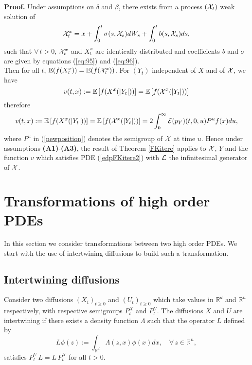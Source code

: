 \documentclass[a4paper, 11pt]{article}
\newenvironment{dem}{\noindent\textbf{Proof.}}{\hfill \framebox[0.6em]{}}
\newcommand{\R}{\mathbb{R}}
\newcommand{\E}{\mathbb{E}}
\newcommand{\1}{\mathbf{1}}
\begin{document}
\begin{dem}
Under assumptions on $\delta$ and $\beta$, there exists from \cite{mimicking} a process $({\cal X}_t)$ weak solution of
\begin{equation}
{\cal X}_t^x=x+\int_0^t \sigma(s,{\cal X}_s)dW_s+\int_0^t b(s,{\cal X}_s)ds,
\end{equation} 
such that $\forall\, t>0$, ${\cal X}_t^x$ and $X_t^x$ are identically distributed and coefficients $b$ and $\sigma$ are given by equations (\ref{eq:95}) and (\ref{eq:96}).\\
Then for all $t$, $\E(f(X_t^x))=\E(f({\cal X}^x_t))$. For $(Y_t)$ independent of $X$ and of ${\cal X}$, we have 
\begin{equation}
v(t,x):=\E \left[f(X^x(|Y_t|))\right]=\E \left[f({\cal X}^x(|Y_t|))\right]
\end{equation}
therefore
\begin{equation}\label{newposition}
v(t,x):=\E \left[f(X^x(|Y_t|))\right]=\E \left[f({\cal X}^x(|Y_t|))\right]=2\int_0^\infty \mathcal{E}(p_Y)(t,0,u)P^uf(x)du, 
\end{equation}
where $P^u$ in (\ref{newposition}) denotes the semigroup of ${\cal X}$ at time $u$. Hence under assumptions {\bf (A1)}-{\bf (A3)}, the result of Theorem \ref{FKitere} applies to ${\cal X}$, $Y$ and the function $v$ which satisfies PDE (\ref{edpFKitere2}) with ${\cal L}$ the infinitesimal generator of ${\cal X}$.\\

\end{dem}

\section{Transformations of high order PDEs}\label{transformations}

\noindent In this section we consider transformations between two high order PDEs. We start with the use of intertwining diffusions to build such a transformation.

\subsection{Intertwining diffusions}\label{sec:intertwining}

\noindent Consider two diffusions $(X_t)_{t\geq 0}$ and $(U_t)_{t\geq 0}$ which take values in $\R^d$ and $ \R^n$ respectively, with respective semigroups $P_t^X$ and  $P_t^U$. The diffusions $X$ and $U$ are intertwining if there exists a density function $\Lambda$ such that the operator $L$ defined by
\begin{equation}
L\phi(z):=\int_{\R^d} \Lambda(z,x)\phi(x)dx, \quad \forall\, z\in\R^n,
\end{equation}
satisfies $P_t^U\, L=L\, P_t^X$ for all $t>0$. 
\end{document}
